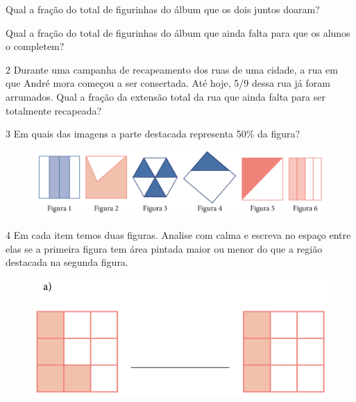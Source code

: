 \begin{escolha}
\item
  Qual a fração do total de figurinhas do álbum que os dois juntos doaram?


\item
  Qual a fração do total de figurinhas do álbum que ainda falta para que os
  alunos o completem?

\end{escolha}


\num{2} Durante uma campanha de recapeamento dos ruas de uma cidade, a rua
em que André mora começou a ser consertada. Até hoje, 5/9 dessa rua já
foram arrumados. Qual a fração da extensão total da rua que ainda falta para ser totalmente recapeada?

\bigskip
\bigskip

\num{3} Em quais das imagens a parte destacada representa 50\% da figura?

\begin{figure}[htpb!]
\includegraphics[width=\textwidth]{../ilustracoes/MAT5/SAEB_5ANO_MAT_figura68.png}
\end{figure}



\pagebreak
\num{4} Em cada item temos duas figuras. Analise com calma e escreva no
espaço entre elas se a primeira figura tem área pintada maior ou menor
do que a região destacada na segunda figura.

\begin{figure}[htpb!]
\centering
\includegraphics[width=.8\textwidth]{../ilustracoes/MAT5/SAEB_5ANO_MAT_figura69-1.png}
\end{figure}

